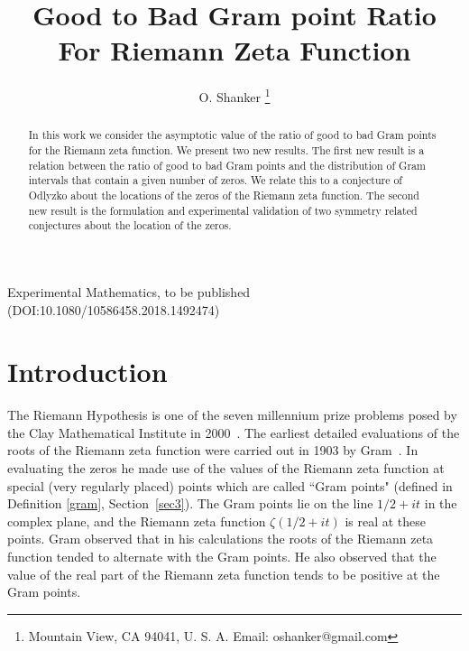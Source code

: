\documentclass[twoside]{article}
\theoremstyle{definition}
\begin{document}
\date{}
\lhead[]{}
\chead[]{}
\rhead[]{}

\title{\bf{Good to Bad Gram point Ratio For Riemann Zeta Function}}
%

\author{O. Shanker 
 \thanks{Mountain View, CA 94041, U. S. A. Email: oshanker@gmail.com
}
}


\maketitle
\thispagestyle{fancy}

\begin{abstract}
In this work we consider the asymptotic value of the ratio of good to bad Gram points for the Riemann zeta function.
We present two new results. The first new result is a relation between the ratio of good to bad Gram points and the distribution of Gram intervals that contain a given number of zeros.
We relate this to a conjecture of Odlyzko about the locations of the zeros of the Riemann zeta function.
The  second new result is the formulation and experimental validation of two 
symmetry related conjectures about the location of the zeros.
\end{abstract}


 
  Experimental Mathematics, to be published (DOI:10.1080/10586458.2018.1492474)


{}


\section{Introduction}
The Riemann Hypothesis is one of the seven millennium prize problems posed by the Clay Mathematical Institute in 2000~\cite{Sarnak 2005}. 
The earliest detailed evaluations of the roots of the Riemann zeta function were carried out in 1903 by Gram~\cite{Gram 1903}.
In evaluating the zeros he made use of the values of the Riemann zeta function at special (very regularly placed) points which are called ``Gram points"
{(defined in Definition \ref{gram}, Section~\ref{sec3})}.
The Gram points lie on the line $1/2+it$ in the complex plane, and the Riemann zeta function $\zeta(1/2+it)$ is real at these points. 
Gram observed that in his calculations the roots of the Riemann zeta function tended to alternate with the Gram points. He also observed that the
value of the real part of the Riemann zeta function tends to be positive at the Gram points. 
\end{document}
